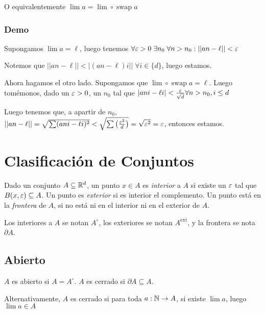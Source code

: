 \documentclass{article}
\begin{document}
O equivalentemente $\lim a = \lim \circ \; \text{swap} \; a$

\subsubsection{Demo}
Supongamos $\lim a = \ell$, luego tenemos $\forall \varepsilon > 0 \; \exists n_0 \; \forall n > n_0 :
||an - \ell|| < \varepsilon$

Notemos que $||an - \ell|| < |(an - \ell) i|| \;\forall i \in \{d\}$, luego estamos.

Ahora hagamos el otro lado. Supongamos que $\lim \circ \;\text{swap}\; a = \ell$.
Luego tomémonos, dado un $\varepsilon > 0$, un $n_0$ tal que $|ani - \ell i| < \frac{\varepsilon}{\sqrt{d}}
\forall n > n_0, i \leq d$

Luego tenemos que, a apartir de $n_0$, $||an - \ell|| = \sqrt{\sum (ani - \ell i)^2}
< \sqrt{\sum \left(\frac{\varepsilon^2}{d} \right)} = \sqrt{\varepsilon^2} = \varepsilon$, entonces estamos.

\section{Clasificación de Conjuntos}
Dado un conjunto $A \subseteq \mathbb{R}^d$, un punto $x \in A$ es \emph{interior} a $A$ si
existe un $\varepsilon$ tal que $B(x, \varepsilon) \subseteq A$. Un punto es \emph{exterior} si es interior
el complemento. Un punto está en la \emph{frontera} de $A$, si no está ni en el interior
ni en el exterior de $A$.

Los interiores a $A$ se notan $A^\circ$, los exteriores se notan $A^{\text{ext}}$, y la
frontera se nota $\partial A$.

\subsection{Abierto}
$A$ es abierto si $A = A^\circ$. $A$ es cerrado si $\partial A \subseteq A$.

Alternativamente, $A$ es cerrado si para toda $a : \mathbb{N} \to A$, si existe $\lim a$, luego
$\lim a \in A$
\end{document}
